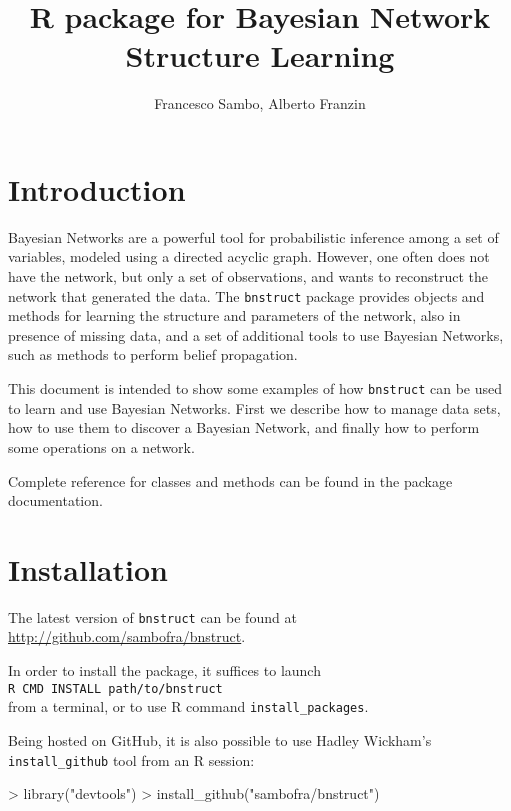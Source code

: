 \documentclass{article}
\newcommand{\Rpackage}[1]{{\texttt{#1}}}
\begin{document}


\title{R package for Bayesian Network Structure Learning}
\author{Francesco Sambo, Alberto Franzin}
\maketitle


\section{Introduction}
Bayesian Networks are a powerful tool for probabilistic inference among a set
of variables, modeled using a directed acyclic graph. However, one often does not
have the network, but only a set of observations, and wants to reconstruct the
network that generated the data. The \Rpackage{bnstruct} package provides objects and methods for
learning the structure and parameters of the network, also in presence of missing data,
and a set of additional tools to use Bayesian Networks, such as methods to perform
belief propagation.

This document is intended to show some examples of how \Rpackage{bnstruct} can be used
to learn and use Bayesian Networks. First we describe how to manage data sets,
how to use them to discover a Bayesian Network, and finally how to perform some
operations on a network.

Complete reference for classes and methods can be found in the package documentation.

\section{Installation}

The latest version of \Rpackage{bnstruct} can be found at \url{http://github.com/sambofra/bnstruct}.

In order to install the package, it suffices to launch\\
\verb!R CMD INSTALL path/to/bnstruct!\\
from a terminal, or to use R command \verb!install_packages!.

Being hosted on GitHub, it is also possible to use Hadley Wickham's \texttt{install\_github} tool from
an R session:
\begin{Schunk}
\begin{Sinput}
> library("devtools")
> install_github("sambofra/bnstruct")
\end{Sinput}
\end{Schunk}
\end{document}
